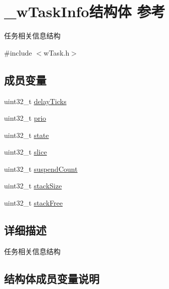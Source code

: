 \hypertarget{struct__w_task_info}{}\section{\+\_\+w\+Task\+Info结构体 参考}
\label{struct__w_task_info}


任务相关信息结构  




{\ttfamily \#include $<$w\+Task.\+h$>$}

\subsection*{成员变量}
\begin{DoxyCompactItemize}
\item 
uint32\+\_\+t \mbox{\hyperlink{struct__w_task_info_a0c1ef2b42e60232fd2355246df290c68}{delay\+Ticks}}
\item 
uint32\+\_\+t \mbox{\hyperlink{struct__w_task_info_a6871573fefee3ad102e26a09e7a2f493}{prio}}
\item 
uint32\+\_\+t \mbox{\hyperlink{struct__w_task_info_a1b0c7bd4d79798ef4e0ce23894c9aeb2}{state}}
\item 
uint32\+\_\+t \mbox{\hyperlink{struct__w_task_info_a4fe7f19d35a11368d300b99348451fdd}{slice}}
\item 
uint32\+\_\+t \mbox{\hyperlink{struct__w_task_info_a70023864793bcef3ab18d4a66832ca6d}{suspend\+Count}}
\item 
uint32\+\_\+t \mbox{\hyperlink{struct__w_task_info_ae20ace955faaa4fb797b69b75feef3d3}{stack\+Size}}
\item 
uint32\+\_\+t \mbox{\hyperlink{struct__w_task_info_ab8b8202c533d50459f39dfab24e8873d}{stack\+Free}}
\end{DoxyCompactItemize}


\subsection{详细描述}
任务相关信息结构 

\subsection{结构体成员变量说明}
\mbox{\label{struct__w_task_info_a0c1ef2b42e60232fd2355246df290c68}} 
